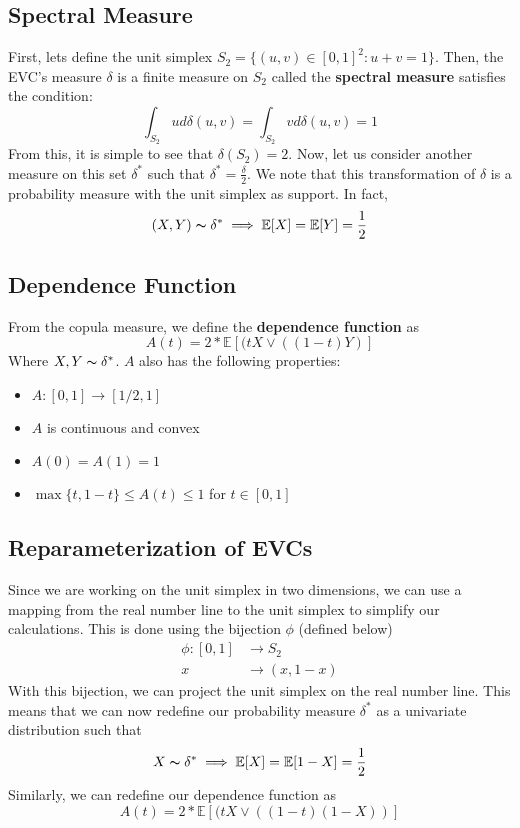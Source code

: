 \documentclass[12pt]{article}
\def\E{\mathbb{E}}
\newcommand{\ds}{\displaystyle}
\theoremstyle{definition}
\theoremstyle{definition}
\begin{document}
\subsection{Spectral Measure}
First, lets define the unit simplex $S_2=\{(u,v)\in [0,1]^2:u+v=1 \}$. Then, the EVC's measure $\delta$ is a finite measure on $S_2$ called the \textbf{spectral measure} satisfies the condition:
$$\int_{S_2}ud\delta(u,v)=\int_{S_2}vd\delta(u,v)=1$$
From this, it is simple to see that $\delta(S_2)=2$. Now, let us consider another measure on this set $\delta^*$ such that $\ds\delta^*=\frac{\delta}{2}$. We note that this transformation of $\delta$ is a probability measure with the unit simplex as support. In fact, 
$$(X,Y)\thicksim \delta^* \implies \E[X]=\E[Y]=\frac{1}{2}$$

\subsection{Dependence Function}
From the copula measure, we define the \textbf{dependence function} as 
$$A(t)=2*\E[(tX\vee ((1-t)Y)]$$ 
Where $X,Y\thicksim \delta^*$. $A$ also has the following properties:
\begin{itemize}
    \item $A:[0,1]\rightarrow[1/2,1]$
    \item $A$ is continuous and convex
    \item $A(0)=A(1)=1$
    \item $\max \{t,1-t\}\leq A(t)\leq 1$ for $t\in[0,1]$
\end{itemize}
\subsection{Reparameterization of EVCs}
Since we are working on the unit simplex in two dimensions, we can use a mapping from the real number line to the unit simplex to simplify our calculations. This is done using the bijection $\phi$ (defined below)
\begin{align*}
    \ds \phi: [0,1] &\rightarrow S_2\\
    x&\rightarrow(x,1-x)
\end{align*}
With this bijection, we can project the unit simplex on the real number line. This means that we can now redefine our probability measure $\delta^*$ as a univariate distribution such that 
$$X\thicksim \delta^* \implies \E[X]=\E[1-X]=\frac{1}{2}$$
Similarly, we can redefine our dependence function as 
$$A(t)=2* \E[(tX\vee ((1-t)(1-X))]$$
\end{document}
